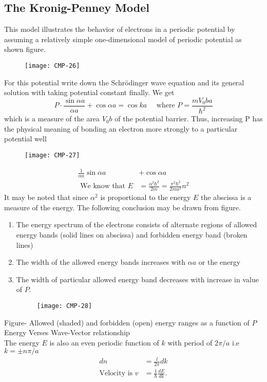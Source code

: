 \subsection{The Kronig-Penney Model}
This model illustrates the behavior of electrons in a periodic potential by assuming a relatively simple one-dimensional model of periodic potential as shown figure.
\begin{figure}[H]
	\centering
	\texttt{[image: CMP-26]}
	\caption{}
	\label{}
\end{figure}
For this potential write down the Schrödinger wave equation and its general solution with taking potential constant finally. We get
$$
P \cdot \frac{\sin \alpha a}{\alpha a}+\cos \alpha a=\cos k a \quad \text { where } P=\frac{m V_{0} b a}{\hbar^{2}}
$$
which is a measure of the area $V_{0} b$ of the potential barrier. Thus, increasing $\mathrm{P}$ has the physical meaning of bonding an electron more strongly to a particular potential well
\begin{figure}[H]
	\centering
	\texttt{[image: CMP-27]}
	\caption{}
	\label{}
\end{figure}
\begin{align*}
\frac{1}{\alpha a} \sin \alpha a&+\cos \alpha a\\
\text { We know that } E&=\frac{\alpha^{2} \hbar^{2}}{2 m}=\frac{\pi^{2} \hbar^{2}}{2 m a^{2}} n^{2}
\end{align*}
It may be noted that since $\alpha^{2}$ is proportional to the energy $E$ the abscissa is a measure of the energy. The following conclusion may be drawn from figure.
\begin{enumerate}[label=\roman*)]
	\item The energy spectrum of the electrons consists of alternate regions of allowed energy bands (solid lines on abscissa) and forbidden energy band (broken lines)
	\item The width of the allowed energy bands increases with $\alpha a$ or the energy
	\item The width of particular allowed energy band decreases with increase in value of $P$.
	\begin{figure}[H]
		\centering
		\texttt{[image: CMP-28]}
		\caption{}
		\label{}
	\end{figure}
\end{enumerate} 
Figure- Allowed (shaded) and forbidden (open) energy ranges as a function of $P$\\
Energy Verses Wave-Vector relationship\\
The energy $E$ is also an even periodic function of $k$ with period of $2 \pi / a$ i.e $k=\pm n \pi / a$
\begin{align*}
d n&=\frac{l}{2 \pi} d k\\
\text{Velocity is }v&=\frac{1}{\hbar} \frac{d E}{d k}.
\end{align*}
